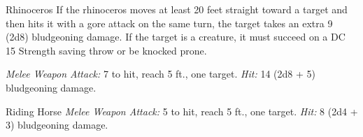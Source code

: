 \documentclass[10pt,a4paper,twoside,bg=print,twocolumn,openany,nodeprecatedcode]{dndbook}
\begin{document}
\begin{DndMonster}[float=t]{Rhinoceros}
\DndMonsterBasics[
armor-class = {11 (natural armor)},
hit-points = {\DndDice{6d10 + 12}},
speed = {40 ft.}
]
\DndMonsterAbilityScores[
 str = 21,
 dex = 8,
 con = 15,
 int = 2,
 wis = 12,
 cha = 6
]
\DndMonsterDetails[
challenge = 2,
]
If the rhinoceros moves at least 20 feet straight toward a target and then hits it with a gore attack on the same turn, the target takes an extra 9 (2d8) bludgeoning damage. If the target is a creature, it must succeed on a DC 15 Strength saving throw or be knocked prone.

\textsl{Melee Weapon Attack:} 7 to hit, reach 5 ft., one target. \textsl{Hit:} 14 (2d8 + 5) bludgeoning damage.

\end{DndMonster}



\begin{DndMonster}[float=t]{Riding Horse}
\DndMonsterBasics[
armor-class = {10},
hit-points = {\DndDice{2d10 + 2}},
speed = {60 ft.}
]
\DndMonsterAbilityScores[
 str = 16,
 dex = 10,
 con = 12,
 int = 2,
 wis = 11,
 cha = 7
]
\DndMonsterDetails[
challenge = 1/4,
]
\textsl{Melee Weapon Attack:} 5 to hit, reach 5 ft., one target. \textsl{Hit:} 8 (2d4 + 3) bludgeoning damage.

\end{DndMonster}
\end{document}
